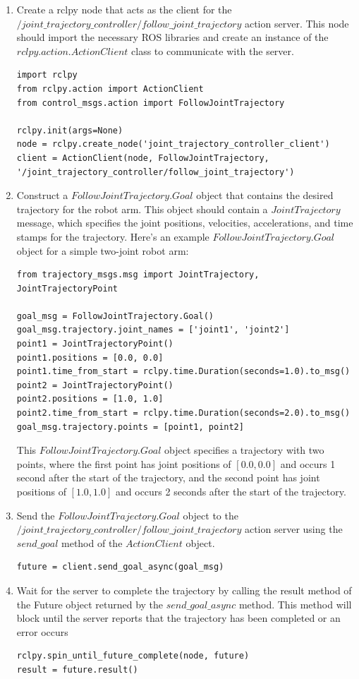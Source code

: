 \documentclass[12pt,oneside]{article}
\begin{document}
\begin{enumerate}
\item Create a rclpy node that acts as the client for the\\ $/joint\_trajectory\_controller/follow\_joint\_trajectory$ action server. This node should import the necessary ROS libraries and create an instance of the $rclpy.action.ActionClient$ class to communicate with the server.
\begin{verbatim}
import rclpy
from rclpy.action import ActionClient
from control_msgs.action import FollowJointTrajectory

rclpy.init(args=None)
node = rclpy.create_node('joint_trajectory_controller_client')
client = ActionClient(node, FollowJointTrajectory, '/joint_trajectory_controller/follow_joint_trajectory')
\end{verbatim}
\item Construct a $FollowJointTrajectory.Goal$ object that contains the desired trajectory for the robot arm. This object should contain a $JointTrajectory$ message, which specifies the joint positions, velocities, accelerations, and time stamps for the trajectory. Here's an example $FollowJointTrajectory.Goal$ object for a simple two-joint robot arm:
\begin{verbatim}
from trajectory_msgs.msg import JointTrajectory, JointTrajectoryPoint

goal_msg = FollowJointTrajectory.Goal()
goal_msg.trajectory.joint_names = ['joint1', 'joint2']
point1 = JointTrajectoryPoint()
point1.positions = [0.0, 0.0]
point1.time_from_start = rclpy.time.Duration(seconds=1.0).to_msg()
point2 = JointTrajectoryPoint()
point2.positions = [1.0, 1.0]
point2.time_from_start = rclpy.time.Duration(seconds=2.0).to_msg()
goal_msg.trajectory.points = [point1, point2]
\end{verbatim}
This $FollowJointTrajectory.Goal$ object specifies a trajectory with two points, where the first point has joint positions of $[0.0, 0.0]$ and occurs 1 second after the start of the trajectory, and the second point has joint positions of $[1.0, 1.0]$ and occurs 2 seconds after the start of the trajectory.
\item Send the $FollowJointTrajectory.Goal$ object to the $/joint\_trajectory\_controller/follow\_joint\_trajectory$ action server using the $send\_goal$ method of the $ActionClient$ object.
\begin{verbatim}
future = client.send_goal_async(goal_msg)
\end{verbatim}
\item Wait for the server to complete the trajectory by calling the result method of the Future object returned by the $send\_goal\_async$ method. This method will block until the server reports that the trajectory has been completed or an error occurs
\begin{verbatim}
rclpy.spin_until_future_complete(node, future)
result = future.result()
\end{verbatim}
\end{enumerate}
\end{document}
